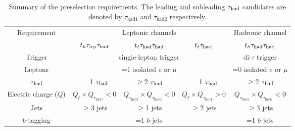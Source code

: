 \documentclass[PAPER, coverpage, atlasdraft=true, texlive=2016, UKenglish]{\ATLASLATEXPATH atlasdoc}
\providecommand{\DIFadd}[1]{{\protect\color{blue}\uwave{#1}}} %
\providecommand{\DIFdel}[1]{{\protect\color{red}\sout{#1}}}                      %
\providecommand{\DIFaddFL}[1]{\DIFadd{#1}} %
\providecommand{\DIFdelFL}[1]{\DIFdel{#1}} %
\providecommand{\DIFaddbeginFL}{} %
\providecommand{\DIFaddendFL}{} %
\providecommand{\DIFdelbeginFL}{} %
\providecommand{\DIFdelendFL}{} %
\begin{document}
\begin{table}[t!]
\caption{\DIFdelbeginFL %
\DIFdelendFL \DIFaddbeginFL \small{Summary of the preselection requirements. 
The leading and subleading $\tau_{\mathrm{had}}$ candidates are denoted by $\tau_{\mathrm{had1}}$ and $\tau_{\mathrm{had2}}$ respectively.}\DIFaddendFL }
\begin{center}
\begin{tabular}{c|ccc|c}
\toprule\toprule
\multirow{2}{*}{Requirement} &  \DIFdelbeginFL %
\DIFdelendFL \DIFaddbeginFL \multicolumn{3}{c|}{Leptonic channels}  \DIFaddendFL & \DIFdelbeginFL %
\DIFdelendFL \DIFaddbeginFL \multicolumn{1}{c}{Hadronic channel} \DIFaddendFL \\ 
& $t_h\tau_{\mathrm{lep}} \tau_{\mathrm{had}}$ & $t_{\ell}\tau_{\mathrm{had}} \tau_{\mathrm{had}}$ &  $t_{\ell}\tau_{\mathrm{had}}$ & $t_h\tau_{\mathrm{had}} \tau_{\mathrm{had}}$\\
\midrule
Trigger & \multicolumn{3}{c|}{single-lepton trigger} & di-$\tau$ trigger  \\
Leptons  & \multicolumn{3}{c|}{=1 isolated $e$ or $\mu$}  & =0 isolated $e$ or $\mu$ \\
$\tau_{\mathrm{had}}$  & $=$1 $\tau_{\mathrm{had}}$ & \DIFdelbeginFL \DIFdelFL{$\geq$}\DIFdelendFL \DIFaddbeginFL \DIFaddFL{$=$}\DIFaddendFL 2 $\tau_{\mathrm{had}}$ & $=$1 $\tau_{\mathrm{had}}$ & \DIFdelbeginFL \DIFdelFL{$\geq$}\DIFdelendFL \DIFaddbeginFL \DIFaddFL{$=$}\DIFaddendFL 2 $\tau_{\mathrm{had}}$ \\
Electric charge ($Q$) & \DIFdelbeginFL \DIFdelFL{$Q_\ell \times Q_{\tau_{\mathrm{had1}}} < 0$ }\DIFdelendFL \DIFaddbeginFL \DIFaddFL{$Q_\ell \times Q_{\tau_{\mathrm{had1}}} = -1$ }\DIFaddendFL & \DIFdelbeginFL \DIFdelFL{$Q_{\tau_{\mathrm{had1}}} \times Q_{\tau_{\mathrm{had2}}} < 0$ }\DIFdelendFL \DIFaddbeginFL \DIFaddFL{$Q_{\tau_{\mathrm{had1}}} \times Q_{\tau_{\mathrm{had2}}} = -1$ }\DIFaddendFL & \DIFdelbeginFL \DIFdelFL{$Q_\ell \times Q_{\tau_{\mathrm{had1}}} > 0$ }\DIFdelendFL \DIFaddbeginFL \DIFaddFL{$Q_\ell \times Q_{\tau_{\mathrm{had1}}} = 1$ }\DIFaddendFL & \DIFdelbeginFL \DIFdelFL{$Q_{\tau_{\mathrm{had1}}} \times Q_{\tau_{\mathrm{had2}}} < 0$ }\DIFdelendFL \DIFaddbeginFL \DIFaddFL{$Q_{\tau_{\mathrm{had1}}} \times Q_{\tau_{\mathrm{had2}}} = -1$ }\DIFaddendFL \\
Jets  &   $\geq$3 jets & $\geq$1 jets & $\geq$2 jets & $\geq$3 jets \\
$b$-tagging & \multicolumn{3}{c|}{=1 $b$-jets} & =1 $b$-jets\\
\bottomrule\bottomrule
\end{tabular}
\label{tab:preselection}
\end{center}
\end{table}
\end{document}
